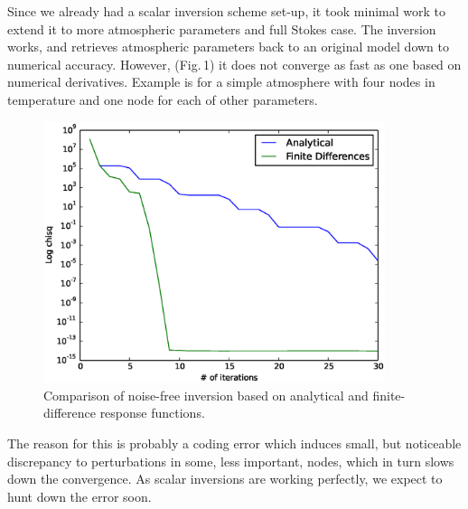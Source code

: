 \documentclass[a4paper,10pt]{article}
\begin{document}
Since we already had a scalar inversion scheme set-up, it took minimal work to extend it to more atmospheric parameters and full Stokes case. The inversion works, and retrieves atmospheric parameters back to an original model down to numerical accuracy. However, (Fig.\,1) it does not converge as fast as one based on numerical derivatives. Example is for a simple atmosphere with four nodes in temperature and one node for each of other parameters. 
\begin{figure}
 \includegraphics[width = 10cm]{convergence_comparison.eps}
 \caption{Comparison of noise-free inversion based on analytical and finite-difference response functions.}
\end{figure}
The reason for this is probably a coding error which induces small, but noticeable discrepancy to perturbations in some, less important, nodes, which in turn slows down the convergence. As scalar inversions are working perfectly, we expect to hunt down the error soon. 
\end{document}

